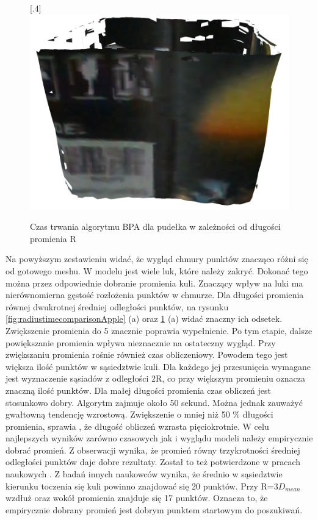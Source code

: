 \begin{figure}[H]
  [.4\linewidth]{\includegraphics[scale=0.32]{bpaBox10x.PNG}}
\caption{Czas trwania algorytmu BPA dla pudełka w zależności od długości promienia R}\label{fig:radiustimecomparisonBox}
\end{figure}

Na powyższym zestawieniu widać, że wygląd chmury punktów znacząco różni się od gotowego meshu. W modelu jest wiele luk, które należy zakryć. Dokonać tego można przez odpowiednie dobranie promienia kuli. Znaczący wpływ na luki ma nierównomierna gęstość rozłożenia punktów w chmurze. Dla długości promienia równej dwukrotnej średniej odległości punktów, na rysunku \ref{fig:radiustimecomparisonApple} (a) oraz \ref{fig:radiustimecomparisonBox} (a) widać znaczny ich odsetek. Zwiększenie promienia do 5 znacznie poprawia wypełnienie. Po tym etapie, dalsze powiększanie promienia wpływa nieznacznie na ostateczny wygląd.
\newline \indent Przy zwiększaniu promienia rośnie również czas obliczeniowy. Powodem tego jest większa ilość punktów w sąsiedztwie kuli. Dla każdego jej przesunięcia wymagane jest wyznaczenie sąsiadów z odległości 2R, co przy większym promieniu oznacza znaczną ilość punktów. Dla małej długości promienia czas obliczeń jest stosunkowo dobry. Algorytm zajmuje około 50 sekund. Można jednak zauważyć gwałtowną tendencję wzrostową. Zwiększenie o mniej niż 50 \% długości promienia, sprawia , że długość obliczeń wzrasta pięciokrotnie. W celu najlepszych wyników zarówno czasowych jak i wyglądu modeli należy empirycznie dobrać promień. Z obserwacji wynika, że promień równy trzykrotności średniej odległości punktów daje dobre rezultaty. Został to też potwierdzone w pracach naukowych \cite{mittleman1999ball}. Z badań innych naukowców wynika, że średnio w sąsiedztwie kierunku toczenia się kuli powinno znajdować się 20 punktów. Przy R=3$D_{mean}$ wzdłuż oraz wokół promienia znajduje się 17 punktów. Oznacza to, że empirycznie dobrany promień jest dobrym punktem startowym do poszukiwań.

